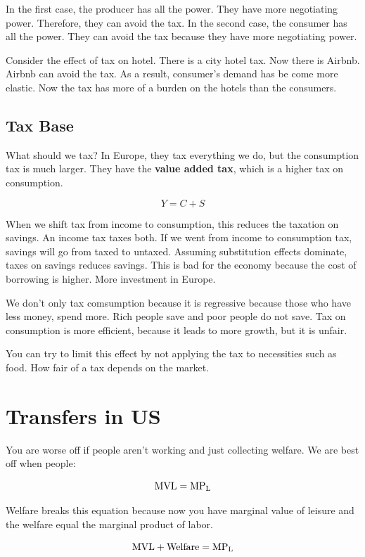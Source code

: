 \documentclass{article}
\begin{document}
In the first case, the producer has all the power. They have more negotiating
power. Therefore, they can avoid the tax. In the second case, the consumer has
all the power. They can avoid the tax because they have more negotiating power. 

Consider the effect of tax on hotel. There is a city hotel tax. Now there is
Airbnb. Airbnb can avoid the tax. As a result, consumer's demand has be come
more elastic. Now the tax has more of a burden on the hotels than the consumers.

\subsection{ Tax Base }

What should we tax? In Europe, they tax everything we do, but the consumption
tax is much larger. They have the \textbf{value added tax}, which is a higher
tax on consumption.

$$ Y = C + S $$

When we shift tax from income to consumption, this reduces the taxation on
savings. An income tax taxes both. If we went from income to consumption tax,
savings will go from taxed to untaxed. Assuming substitution effects dominate,
taxes on savings reduces savings. This is bad for the economy because the cost
of borrowing is higher. More investment in Europe.

We don't only tax comsumption because it is regressive because those who have
less money, spend more. Rich people save and poor people do not save. Tax on
consumption is more efficient, because it leads to more growth, but it is
unfair.

You can try to limit this effect by not applying the tax to necessities such as
food. How fair of a tax depends on the market. 

\section{ Transfers in US }

You are worse off if people aren't working and just collecting welfare. We are
best off when people:

$$ \rm{MVL} = \rm{MP_{L}} $$

Welfare breaks this equation because now you have marginal value of leisure and
the welfare equal the marginal product of labor. 

$$ \rm{MVL} + \rm{Welfare} = \rm{MP_{L}} $$
\end{document}
